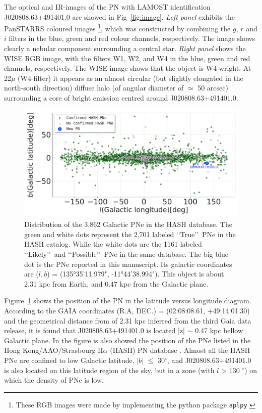 \documentclass[fleqn,usenatbib]{mnras}
\begin{document}
The optical and IR-images of the PN with LAMOST
identification J020808.63+491401.0 are showed in Fig~\ref{fig:image}.
\textit{Left panel} exhibits the PanSTARRS coloured
images \footnote{These RGB images were made by implementing
the python package \texttt{aplpy} \citep{aplpy:2019}}, which
was constructed by combining the $g$, $r$ and $i$ filters in
the blue, green and red colour channels, respectively.
The image shows clearly a nebular component surrounding 
a central star. \textit{Right panel} shows the
WISE RGB image, with the filters W1, W2, and W4 in
the blue, green and red channels, respectively.
The WISE image shows that the object is W4 wright.  
At 22$\mu$ (W4-filter) it appears as an almost
circular (but slightly elongated in the north-south direction)
diffuse halo (of angular diameter of $\simeq$ 50 arcsec) surrounding
a core of bright emission centred around J020808.63+491401.0.

\begin{figure}
\centering
  \includegraphics[width=0.9\linewidth]{Figs/galctic-coord-pn.pdf}
  \caption{Distribution of the 3,862 Galactic PNe in the HASH database.
    The green and white dots represent the 2,701 labeled \lq\lq True\rq\rq~PNe in the HASH catalog.
    While the white dots are the 1161 labeled \lq\lq Likely\rq\rq~and \lq\lq Possible\rq\rq~PNe in
    the same database. The big blue dot is the PNe reported in this manuscript. Its galactic coordinates
    are ($l, b$) = (135°35'11.979", -11°44'38.994"). This object is about 2.31 kpc from
    Earth, and 0.47 kpc
from the Galactic plane.} 
  \label{fig:position}
\end{figure}

Figure~\ref{fig:position} shows the position of the PN in the latitude versus longitude
diagram.  According to the GAIA coordinates (R.A, DEC.) = (02:08:08.61, +49:14:01.30)
and the geometrical distance
from \citet{Bailer:2021} of 2.31 kpc inferred from the third Gaia data release,
it is found that J020808.63+491401.0 is located |z| $\sim$ 0.47 kpc bellow
Galactic plane. In the figure is also showed the position of the PNe listed in the
Hong Kong/AAO/Strasbourg H{$\alpha$} (HASH) PN database \citep{Parker:2016}. Almost all
the HASH PNe are confined to low Galactic latitude, $|b|$ $\leq$ 30$^{\circ}$, and
J020808.63+491401.0 is also located on this latitude region of the sky, but in a zone
(with $l$ > 130 $^{\circ}$) on which the density of PNe is low.
\end{document}
